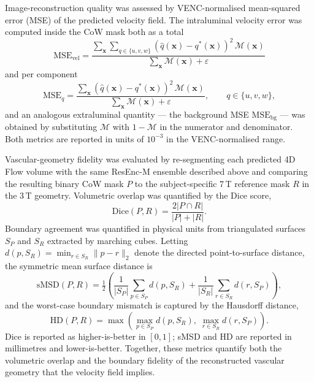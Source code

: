 \documentclass[11pt]{article}
\begin{document}
Image-reconstruction quality was assessed by VENC-normalised
mean-squared error (MSE) of the predicted velocity field. The
intraluminal velocity error was computed inside the CoW mask both
as a total
\begin{equation}
    \mathrm{MSE}_{\text{vel}}
    = \frac{\sum_{\mathbf{x}}
            \sum_{q\in\{u,v,w\}}\!\!
            (\hat{q}(\mathbf{x})-q^{*}(\mathbf{x}))^{2}\,
            \mathcal{M}(\mathbf{x})}
           {\sum_{\mathbf{x}}\mathcal{M}(\mathbf{x}) + \varepsilon}
\end{equation}
and per component
\begin{equation}
    \mathrm{MSE}_{q}
    = \frac{\sum_{\mathbf{x}}
            (\hat{q}(\mathbf{x})-q^{*}(\mathbf{x}))^{2}\,
            \mathcal{M}(\mathbf{x})}
           {\sum_{\mathbf{x}}\mathcal{M}(\mathbf{x}) + \varepsilon},
    \qquad q \in \{u,v,w\},
\end{equation}
and an analogous extraluminal quantity --- the background MSE
$\mathrm{MSE}_{\text{bg}}$ --- was obtained by substituting
$\mathcal{M}$ with $1-\mathcal{M}$ in the numerator and denominator.
Both metrics are reported in units of $10^{-3}$ in the
VENC-normalised range.

Vascular-geometry fidelity was evaluated by re-segmenting each
predicted 4D Flow volume with the same ResEnc-M ensemble described
above and comparing the resulting binary CoW mask $P$ to the
subject-specific 7\,T reference mask $R$ in the 3\,T geometry. Volumetric
overlap was quantified by the Dice score,
\begin{equation}
    \mathrm{Dice}(P,R)
    = \frac{2\lvert P \cap R \rvert}{\lvert P \rvert + \lvert R \rvert}.
\end{equation}
Boundary agreement was quantified in physical units from
triangulated surfaces $S_P$ and $S_R$ extracted by marching cubes.
Letting
$d(p,S_R) = \min_{r \in S_R} \lVert p - r \rVert_{2}$ denote the
directed point-to-surface distance, the symmetric mean surface
distance is
\begin{equation}
    \mathrm{sMSD}(P,R)
    = \tfrac{1}{2}\!\left(
        \frac{1}{|S_P|}\sum_{p\in S_P} d(p,S_R)
        + \frac{1}{|S_R|}\sum_{r\in S_R} d(r,S_P)
      \right),
\end{equation}
and the worst-case boundary mismatch is captured by the Hausdorff
distance,
\begin{equation}
    \mathrm{HD}(P,R)
    = \max\!\left(
        \max_{p\in S_P} d(p,S_R),\;
        \max_{r\in S_R} d(r,S_P)
      \right).
\end{equation}
Dice is reported as higher-is-better in $[0,1]$; sMSD and HD are
reported in millimetres and lower-is-better. Together, these metrics
quantify both the volumetric overlap and the boundary fidelity of the
reconstructed vascular geometry that the velocity field implies.
\end{document}
